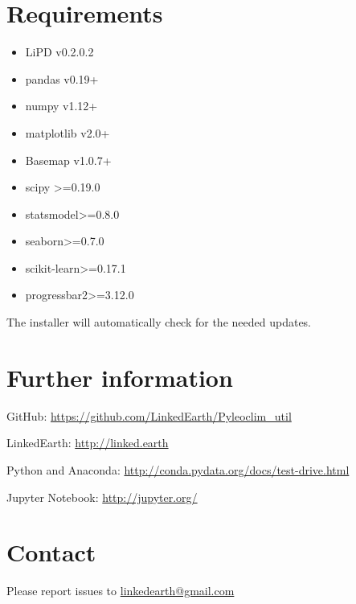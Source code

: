 \documentclass[letterpaper,10pt,english]{sphinxmanual}
\begin{document}
\section{Requirements}
\label{\detokenize{Introduction:requirements}}\begin{itemize}
\item {} 
LiPD v0.2.0.2

\item {} 
pandas v0.19+

\item {} 
numpy v1.12+

\item {} 
matplotlib v2.0+

\item {} 
Basemap v1.0.7+

\item {} 
scipy \textgreater{}=0.19.0

\item {} 
statsmodel\textgreater{}=0.8.0

\item {} 
seaborn\textgreater{}=0.7.0

\item {} 
scikit-learn\textgreater{}=0.17.1

\item {} 
progressbar2\textgreater{}=3.12.0

\end{itemize}

The installer will automatically check for the needed updates.


\section{Further information}
\label{\detokenize{Introduction:further-information}}
\begin{DUlineblock}{0em}
\item[] GitHub: \url{https://github.com/LinkedEarth/Pyleoclim\_util}
\item[] LinkedEarth: \url{http://linked.earth}
\item[] Python and Anaconda: \url{http://conda.pydata.org/docs/test-drive.html}
\item[] Jupyter Notebook: \url{http://jupyter.org/}
\end{DUlineblock}


\section{Contact}
\label{\detokenize{Introduction:contact}}
Please report issues to \href{mailto:linkedearth@gmail.com}{linkedearth@gmail.com}
\end{document}
